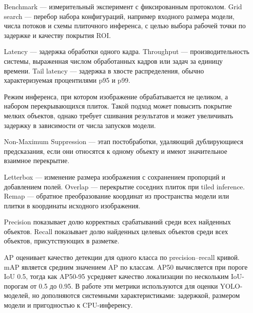 \documentclass[12pt,a4paper,oneside,openany]{report}
\begin{document}
\begin{description}[style=nextline,leftmargin=1.25cm,labelsep=0.5em]
  \item[Benchmark, grid search]
      Benchmark --- измерительный эксперимент с фиксированным протоколом. Grid search ---
      перебор набора конфигураций, например входного размера модели, числа потоков и схемы
      плиточного инференса, с целью выбора рабочей точки по задержке и качеству покрытия ROI.

  \item[Latency, throughput, tail latency]
      Latency --- задержка обработки одного кадра. Throughput --- производительность системы,
      выраженная числом обработанных кадров или задач за единицу времени. Tail latency ---
      задержка в хвосте распределения, обычно характеризуемая процентилями p95 и p99.

  \item[Tiled inference]
      Режим инференса, при котором изображение обрабатывается не целиком, а набором перекрывающихся
      плиток. Такой подход может повысить покрытие мелких объектов, однако требует сшивания
      результатов и может увеличивать задержку в зависимости от числа запусков модели.

  \item[NMS]
      Non-Maximum Suppression --- этап постобработки, удаляющий дублирующиеся предсказания,
      если они относятся к одному объекту и имеют значительное взаимное перекрытие.

  \item[Letterbox, overlap, remap]
      Letterbox --- изменение размера изображения с сохранением пропорций и добавлением полей.
      Overlap --- перекрытие соседних плиток при tiled inference. Remap --- обратное преобразование
      координат из пространства модели или плитки в координаты исходного изображения.

  \item[Precision и Recall]
      Precision показывает долю корректных срабатываний среди всех найденных объектов. Recall
      показывает долю найденных целевых объектов среди всех объектов, присутствующих в разметке.

  \item[AP, AP50, AP50-95 и mAP]
      AP оценивает качество детекции для одного класса по precision--recall кривой. mAP является
      средним значением AP по классам. AP50 вычисляется при пороге IoU 0.5, тогда как AP50-95
      усредняет качество локализации по нескольким IoU-порогам от 0.5 до 0.95. В работе эти
      метрики используются для оценки YOLO-моделей, но дополняются системными характеристиками:
      задержкой, размером модели и пригодностью к CPU-инференсу.


\end{description}
\end{document}

